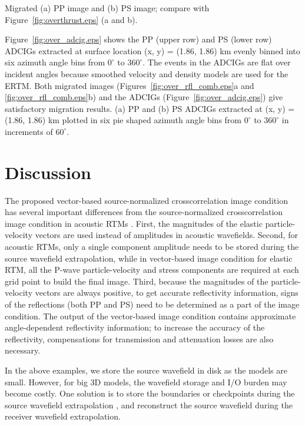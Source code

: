\documentclass[manuscript,ulem,graphix,revised]{geophysics}
\begin{document}
{
Migrated (a) PP image and (b) PS image; compare with Figure~\ref{fig:overthrust.eps} (a and b).
}

Figure~\ref{fig:over_adcig.eps} shows the PP (upper row) and PS (lower row) ADCIGs extracted at surface location (x, y) = (1.86, 1.86) km evenly binned into six azimuth angle bins from $\mathrm{0^\circ}$ to $\mathrm{360^\circ}$. The events in the ADCIGs are flat over incident angles because smoothed velocity and density models are used for the ERTM. Both migrated images (Figures~\ref{fig:over_rfl_comb.eps}a and \ref{fig:over_rfl_comb.eps}b) and the ADCIGs (Figure~\ref{fig:over_adcig.eps}) give satisfactory migration results.
{
(a) PP and (b) PS ADCIGs extracted at (x, y) = (1.86, 1.86) km plotted in six pie shaped azimuth angle bins from $\mathrm{0^\circ}$ to $\mathrm{360^\circ}$ in increments of $\mathrm{60^\circ}$.
}

\section{Discussion}

The proposed vector-based source-normalized crosscorrelation image condition has several important differences from the source-normalized crosscorrelation image condition in acoustic RTMs \citep{kaelin06}. First, the magnitudes of the elastic particle-velocity vectors are used instead of amplitudes in acoustic wavefields. Second, for acoustic RTMs, only a single component amplitude needs to be stored during the source wavefield extrapolation, while in vector-based image condition for elastic RTM, all the P-wave particle-velocity and stress components are required at each grid point to build the final image. Third, because the magnitudes of the particle-velocity vectors are always positive, to get accurate reflectivity information, signs of the reflections (both PP and PS) need to be determined as a part of the image condition. The output of the vector-based image condition contains approximate angle-dependent reflectivity information; to increase the accuracy of the reflectivity, compensations for transmission and attenuation losses \citep{deng07,deng08} are also necessary.

In the above examples, we store the source wavefield in disk as the models are small. However, for big 3D models, the wavefield storage and I/O burden may become costly. One solution is to store the boundaries or checkpoints during the source wavefield extrapolation \citep{bao15}, and reconstruct the source wavefield during the receiver wavefield extrapolation.
\end{document}
